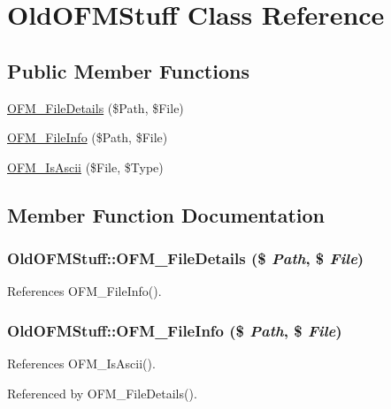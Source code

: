 \section{OldOFMStuff Class Reference}
\label{classOldOFMStuff}
\subsection*{Public Member Functions}
\begin{DoxyCompactItemize}
\item 
\hyperlink{classOldOFMStuff_af1e0b3594d0067d2a1521e433e953d31}{OFM\_\-FileDetails} (\$Path, \$File)
\item 
\hyperlink{classOldOFMStuff_a3581c36a611c8ef33f7a16789cec9d5d}{OFM\_\-FileInfo} (\$Path, \$File)
\item 
\hyperlink{classOldOFMStuff_a5ba4191cf6b199f40bc9209a6e67a119}{OFM\_\-IsAscii} (\$File, \$Type)
\end{DoxyCompactItemize}


\subsection{Member Function Documentation}
\subsubsection[{OFM\_\-FileDetails}]{\setlength{\rightskip}{0pt plus 5cm}OldOFMStuff::OFM\_\-FileDetails (\$ {\em Path}, \/  \$ {\em File})}\label{classOldOFMStuff_af1e0b3594d0067d2a1521e433e953d31}


References OFM\_\-FileInfo().

\subsubsection[{OFM\_\-FileInfo}]{\setlength{\rightskip}{0pt plus 5cm}OldOFMStuff::OFM\_\-FileInfo (\$ {\em Path}, \/  \$ {\em File})}\label{classOldOFMStuff_a3581c36a611c8ef33f7a16789cec9d5d}


References OFM\_\-IsAscii().



Referenced by OFM\_\-FileDetails().

